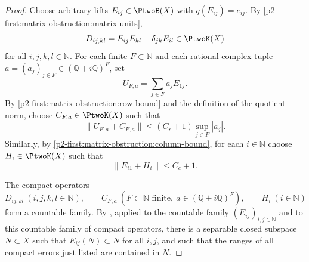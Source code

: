 \documentclass[11pt,reqno]{amsart}
\makeatletter
\theoremstyle{plain}
\theoremstyle{definition}
\newcommand{\N}{\mathbb N}
\newcounter{problempaper}
\newenvironment{problempaperbody}{%
  \setcounter{subsection}{0}%
  \setcounter{subsubsection}{0}%
  \setcounter{paragraph}{0}%
  \renewcommand{\thesubsection}{\arabic{subsection}}%
  \renewcommand{\thesubsubsection}{\thesubsection.\arabic{subsubsection}}%
  \renewcommand{\theparagraph}{\thesubsubsection.\arabic{paragraph}}%
  \let\problem@outersection\section
  \let\problem@outersubsection\subsection
  \let\problem@outersubsubsection\subsubsection
  \let\problem@outerparagraph\paragraph
  \let\section\problem@papersection
  \let\subsection\problem@papersubsection
  \let\subsubsection\problem@papersubsubsection
}{%
  \let\section\problem@outersection
  \let\subsection\problem@outersubsection
  \let\subsubsection\problem@outersubsubsection
  \let\paragraph\problem@outerparagraph
}
\newcommand{\problem@target}[2]{%
  \hypertarget{problem-\theproblempaper-#1-#2}{}%
}
\newcommand{\problem@paperheading}[3]{%
  \par\bigskip
  \problem@target{#1}{#2}%
  \noindent{\large\bfseries #2.\quad #3\par}%
  \nobreak\smallskip
}
\newcommand{\problem@papersubheading}[3]{%
  \par\medskip
  \problem@target{#1}{#2}%
  \noindent{\normalsize\bfseries #2.\quad #3\par}%
  \nobreak\smallskip
}
\newcommand{\problem@papersubsubheading}[3]{%
  \par\smallskip
  \problem@target{#1}{#2}%
  \noindent{\normalsize\itshape #2.\quad #3.\ }%
}
\def\problem@papersection{%
  \@ifstar{\problem@papersectionstar}{\problem@papersectionnostar}%
}
\def\problem@papersectionstar#1{%
  \par\bigskip\noindent{\large\bfseries #1\par}\nobreak\smallskip
}
\def\problem@papersectionnostar#1{%
  \refstepcounter{subsection}%
  \setcounter{subsubsection}{0}%
  \setcounter{paragraph}{0}%
  \problem@paperheading{section}{\thesubsection}{#1}%
  \problem@writecontentsline{section}{\thesubsection}{#1}%
}
\def\problem@papersubsection{%
  \@ifstar{\problem@papersubsectionstar}{\problem@papersubsectionnostar}%
}
\def\problem@papersubsectionstar#1{%
  \par\medskip\noindent{\normalsize\bfseries #1\par}\nobreak\smallskip
}
\def\problem@papersubsectionnostar#1{%
  \refstepcounter{subsubsection}%
  \setcounter{paragraph}{0}%
  \problem@papersubheading{subsection}{\thesubsubsection}{#1}%
  \problem@writecontentsline{subsection}{\thesubsubsection}{#1}%
}
\def\problem@papersubsubsection{%
  \@ifstar{\problem@papersubsubsectionstar}{\problem@papersubsubsectionnostar}%
}
\def\problem@papersubsubsectionstar#1{%
  \par\smallskip\noindent{\normalsize\itshape #1.\ }%
}
\def\problem@papersubsubsectionnostar#1{%
  \refstepcounter{paragraph}%
  \problem@papersubsubheading{subsubsection}{\theparagraph}{#1}%
  \problem@writecontentsline{subsubsection}{\theparagraph}{#1}%
}
\newcommand{\problem@writecontentsline}[3]{%
  \begingroup
  \protected@write\@auxout{}{%
    \string\problemcontentsentry{\theproblempaper}{#1}{#2}{#3}{\thepage}%
  }%
  \endgroup
}
\newcommand{\problemcontentsentry}[5]{%
  \@ifundefined{problemcontents@#1}{%
    \expandafter\gdef\csname problemcontents@#1\endcsname{}%
  }{}%
  \expandafter\g@addto@macro\csname problemcontents@#1\endcsname{%
    \problemcontentsline{#1}{#2}{#3}{#4}{#5}%
  }%
}
\newcommand{\problemcontentslink}[4]{%
  \hyperlink{problem-#1-#2-#3}{#4}%
}
\newcommand{\problemcontentsline}[5]{%
  \ifstrequal{#2}{section}{%
    \par\noindent
    \problemcontentslink{#1}{#2}{#3}{\makebox[2.5em][l]{#3}#4}%
    \nobreak\dotfill
    \problemcontentslink{#1}{#2}{#3}{#5}\par
  }{%
    \ifstrequal{#2}{subsection}{%
      \par\noindent\hspace*{1.5em}%
      \problemcontentslink{#1}{#2}{#3}{\makebox[3.5em][l]{#3}#4}%
      \nobreak\dotfill
      \problemcontentslink{#1}{#2}{#3}{#5}\par
    }{%
      \par\noindent\hspace*{3em}%
      \problemcontentslink{#1}{#2}{#3}{\makebox[4.5em][l]{#3}#4}%
      \nobreak\dotfill
      \problemcontentslink{#1}{#2}{#3}{#5}\par
    }%
  }%
}
\makeatother
\begin{document}
\begin{problempaperbody}
\begin{proof}
Choose arbitrary lifts $E_{ij}\in\PtwoB(X)$ with $q(E_{ij})=e_{ij}$. By \ref{p2-first:matrix-obstruction:matrix-units},
\begin{equation*}
        D_{ij,kl}=E_{ij}E_{kl}-\delta_{jk}E_{il}\in\PtwoK(X)
\end{equation*}
for all $i,j,k,l\in\N$. For each finite $F\subset\N$ and each rational complex tuple $a=(a_j)_{j\in F}\in(\mathbb Q+i\mathbb Q)^F$, set
\begin{equation*}
        U_{F,a}=\sum_{j\in F}a_jE_{1j}.
\end{equation*}
By \ref{p2-first:matrix-obstruction:row-bound} and the definition of the quotient norm, choose $C_{F,a}\in\PtwoK(X)$ such that
\begin{equation}
\label{p2-first:eq:row-correction}
        \|U_{F,a}+C_{F,a}\|\leq(C_r+1)\sup_{j\in F}|a_j|.
\end{equation}
Similarly, by \ref{p2-first:matrix-obstruction:column-bound}, for each $i\in\N$ choose $H_i\in\PtwoK(X)$ such that
\begin{equation}
\label{p2-first:eq:column-correction}
        \|E_{i1}+H_i\|\leq C_c+1.
\end{equation}

The compact operators
\begin{equation*}
        D_{ij,kl}\ (i,j,k,l\in\N),\qquad
        C_{F,a}\ (F\subset\N\text{ finite},\ a\in(\mathbb Q+i\mathbb Q)^F),\qquad
        H_i\ (i\in\N)
\end{equation*}
form a countable family. By , applied to the countable family $(E_{ij})_{i,j \in \N}$ and to this countable family of compact operators, there is a separable closed subspace $N\subset X$ such that $E_{ij}(N)\subset N$ for all $i,j$, and such that the ranges of all compact errors just listed are contained in $N$.


\end{proof}
\end{problempaperbody}
\end{document}
